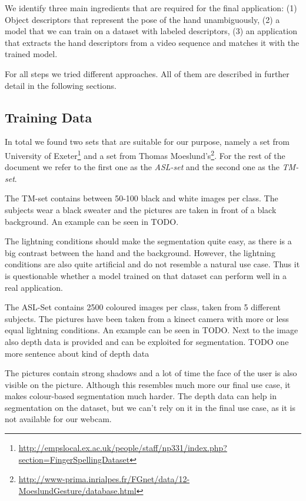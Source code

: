 \documentclass[letterpaper, 10 pt, conference]{ieeeconf}  %
\begin{document}
We identify three main ingredients that are required for the final application: (1) Object descriptors that represent the pose of the hand unambiguously, (2) a model that we can train on a dataset with labeled descriptors, (3) an application that extracts the hand descriptors from a video sequence and matches it with the trained model.

For all steps we tried different approaches. All of them are described in further detail in the following sections. 

\subsection{Training Data}

In total we found two sets that are suitable for our purpose, namely a set from University of Exeter\footnote{\url{http://empslocal.ex.ac.uk/people/staff/np331/index.php?section=FingerSpellingDataset}} and a set from Thomas Moeslund's\footnote{\url{http://www-prima.inrialpes.fr/FGnet/data/12-MoeslundGesture/database.html}}. For the rest of the document we refer to the first one as the \textit{ASL-set} and the second one as the \textit{TM-set}.

The TM-set contains between 50-100 black and white images per class. The subjects wear a black sweater and the pictures are taken in front of a black background. An example can be seen in TODO.

The lightning conditions should make the segmentation quite easy, as there is a big contrast between the hand and the background. However, the lightning conditions are also quite artificial and do not resemble a natural use case. Thus it is questionable whether a model trained on that dataset can perform well in a real application.

The ASL-Set contains 2500 coloured images per class, taken from 5 different subjects. The pictures have been taken from a kinect camera with more or less equal lightning conditions. An example can be seen in TODO. Next to the image also depth data is provided and can be exploited for segmentation. TODO one more sentence about kind of depth data

The pictures contain strong shadows and a lot of time the face of the user is also visible on the picture. Although this resembles much more our final use case, it makes colour-based segmentation much harder. The depth data can help in segmentation on the dataset, but we can't rely on it in the final use case, as it is not available for our webcam.
\end{document}
